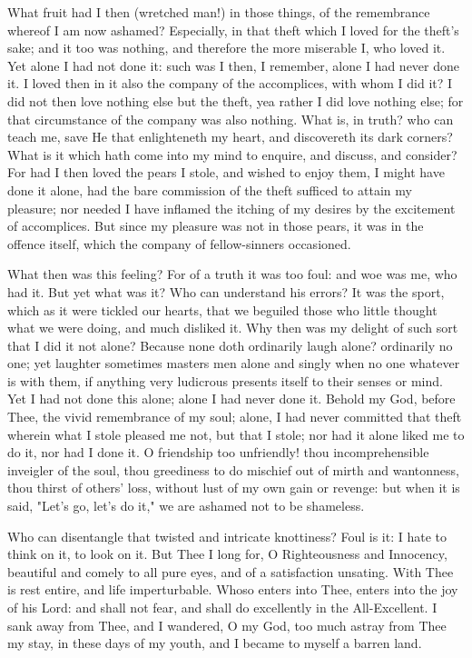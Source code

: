 \documentclass[b5paper,openright,12pt,twoside]{book}
\begin{document}
What fruit had I then (wretched man!) in those things, of the
remembrance whereof I am now ashamed? Especially, in that theft which
I loved for the theft's sake; and it too was nothing, and therefore the
more miserable I, who loved it. Yet alone I had not done it: such was I
then, I remember, alone I had never done it. I loved then in it also
the company of the accomplices, with whom I did it? I did not then love
nothing else but the theft, yea rather I did love nothing else; for that
circumstance of the company was also nothing. What is, in truth? who can
teach me, save He that enlighteneth my heart, and discovereth its
dark corners? What is it which hath come into my mind to enquire, and
discuss, and consider? For had I then loved the pears I stole,
and wished to enjoy them, I might have done it alone, had the bare
commission of the theft sufficed to attain my pleasure; nor needed
I have inflamed the itching of my desires by the excitement of
accomplices. But since my pleasure was not in those pears, it was in the
offence itself, which the company of fellow-sinners occasioned.

What then was this feeling? For of a truth it was too foul: and woe was
me, who had it. But yet what was it? Who can understand his errors? It
was the sport, which as it were tickled our hearts, that we beguiled
those who little thought what we were doing, and much disliked it. Why
then was my delight of such sort that I did it not alone? Because none
doth ordinarily laugh alone? ordinarily no one; yet laughter sometimes
masters men alone and singly when no one whatever is with them, if
anything very ludicrous presents itself to their senses or mind. Yet
I had not done this alone; alone I had never done it. Behold my God,
before Thee, the vivid remembrance of my soul; alone, I had never
committed that theft wherein what I stole pleased me not, but that
I stole; nor had it alone liked me to do it, nor had I done it. O
friendship too unfriendly! thou incomprehensible inveigler of the soul,
thou greediness to do mischief out of mirth and wantonness, thou thirst
of others' loss, without lust of my own gain or revenge: but when it is
said, "Let's go, let's do it," we are ashamed not to be shameless.

Who can disentangle that twisted and intricate knottiness? Foul is it: I
hate to think on it, to look on it. But Thee I long for, O Righteousness
and Innocency, beautiful and comely to all pure eyes, and of a
satisfaction unsating. With Thee is rest entire, and life imperturbable.
Whoso enters into Thee, enters into the joy of his Lord: and shall not
fear, and shall do excellently in the All-Excellent. I sank away from
Thee, and I wandered, O my God, too much astray from Thee my stay, in
these days of my youth, and I became to myself a barren land.
\end{document}
